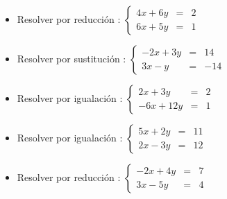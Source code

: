\documentclass[11pt, twocolumn, landscape, a4paper]{article}
\begin{document}
\begin{itemize}
\item{Resolver por reducción : $\left\{\begin{matrix} 4x + 6y &=& 2 \\ 6x + 5y &=& 1\end{matrix}\right.$}
\item{Resolver por sustitución : $\left\{\begin{matrix} -2x + 3y &=& 14 \\ 3x - y &=& -14\end{matrix}\right.$}
\item{Resolver por igualación : $\left\{\begin{matrix} 2x + 3y &=& 2 \\ -6x + 12y &=& 1\end{matrix}\right.$}
\item{Resolver por igualación : $\left\{\begin{matrix} 5x + 2y &=& 11 \\ 2x - 3y &=& 12\end{matrix}\right.$}
\item{Resolver por reducción : $\left\{\begin{matrix} -2x + 4y &=& 7 \\ 3x - 5y &=& 4\end{matrix}\right.$}
\end{itemize}
\end{document}
